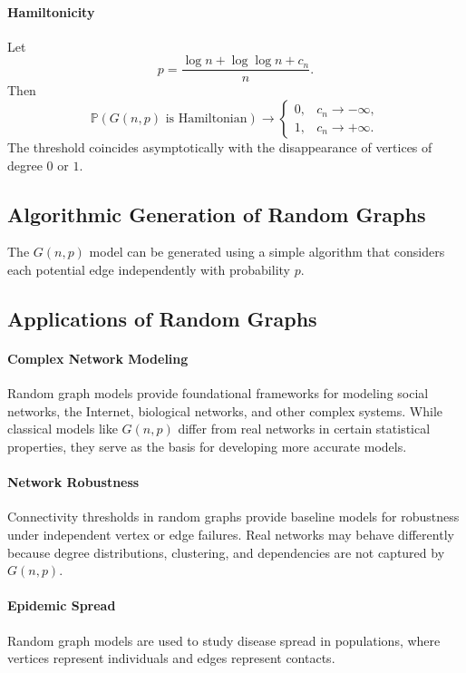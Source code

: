 \paragraph{Hamiltonicity}
\begin{theorem}
Let
\[
    p=\frac{\log n+\log\log n+c_n}{n}.
\]
Then
\[
\mathbb{P}(G(n,p)\text{ is Hamiltonian})\longrightarrow
\begin{cases}
0, & c_n\to-\infty,\\
1, & c_n\to+\infty.
\end{cases}
\]
The threshold coincides asymptotically with the disappearance of vertices of degree $0$ or $1$.
\end{theorem}

\subsection{Algorithmic Generation of Random Graphs}
The $G(n,p)$ model can be generated using a simple algorithm that considers each potential edge independently with probability $p$.

\subsection{Applications of Random Graphs}

\paragraph{Complex Network Modeling}
Random graph models provide foundational frameworks for modeling social networks, the Internet, biological networks, and other complex systems. While classical models like $G(n,p)$ differ from real networks in certain statistical properties, they serve as the basis for developing more accurate models.

\paragraph{Network Robustness}
Connectivity thresholds in random graphs provide baseline models for robustness under independent vertex or edge failures. Real networks may behave differently because degree distributions, clustering, and dependencies are not captured by $G(n,p)$.

\paragraph{Epidemic Spread}
Random graph models are used to study disease spread in populations, where vertices represent individuals and edges represent contacts.

